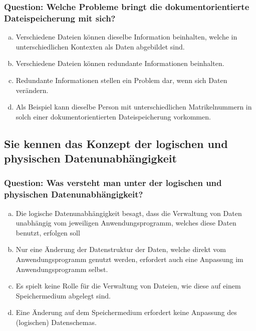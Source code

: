 \documentclass{article}
\begin{document}
\begin{adjustwidth}{2em}{2em}
\begin{adjustwidth}{2em}{2em}
\begin{adjustwidth}{1em}{}
				\subsubsection*{Question: Welche Probleme bringt die dokumentorientierte Dateispeicherung mit sich?}
				\begin{adjustwidth}{1em}{}
					\begin{enumerate}[(a)]
						\item Verschiedene Dateien können dieselbe Information beinhalten, welche in unterschiedlichen Kontexten als Daten abgebildet sind.
						\item Verschiedene Dateien können redundante Informationen beinhalten.
						\item Redundante Informationen stellen ein Problem dar, wenn sich Daten verändern.
						\item Als Beispiel kann dieselbe Person mit unterschiedlichen Matrikelnummern in solch einer dokumentorientierten Dateispeicherung vorkommen.
					\end{enumerate}
				\end{adjustwidth}
			\end{adjustwidth}
			\subsection{Sie kennen das Konzept der logischen und physischen Datenunabhängigkeit}
			\begin{adjustwidth}{1em}{}
				\subsubsection*{Question: Was versteht man unter der logischen und physischen Datenunabhängigkeit?}
				\begin{adjustwidth}{1em}{}
					\begin{enumerate}[(a)]
						\item Die logische Datenunabhängigkeit besagt, dass die Verwaltung von Daten unabhängig vom jeweiligen Anwendungsprogramm, welches diese Daten benutzt, erfolgen soll
						\item Nur eine Änderung der Datenstruktur der Daten, welche direkt vom Anwendungsprogramm genutzt werden, erfordert auch eine Anpassung im Anwendungsprogramm selbst.
						\item Es spielt keine Rolle für die Verwaltung von Dateien, wie diese auf einem Speichermedium abgelegt sind.
						\item Eine Änderung auf dem Speichermedium erfordert keine Anpassung des (logischen) Datenschemas.
					\end{enumerate}
				\end{adjustwidth}
			\end{adjustwidth}

\end{adjustwidth}
\end{adjustwidth}
\end{document}
